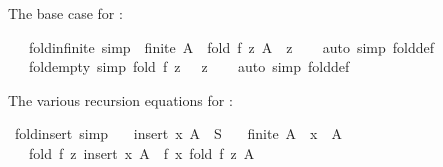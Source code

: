 \begin{isabellebody}
\begin{isamarkuptext}
The base case for :%
\end{isamarkuptext}\isamarkuptrue%
\isamarkupfalse%
\ {\isacharparenleft}{\kern0pt}\ {\isacharminus}{\kern0pt}{\isacharparenright}{\kern0pt}\ fold{\isacharunderscore}{\kern0pt}infinite\ {\isacharbrackleft}{\kern0pt}simp{\isacharbrackright}{\kern0pt}{\isacharcolon}{\kern0pt}\ {\isachardoublequoteopen}{\isasymnot}\ finite\ A\ {\isasymLongrightarrow}\ fold\ f\ z\ A\ {\isacharequal}{\kern0pt}\ z{\isachardoublequoteclose}\isanewline
%
\isadelimproof
\ \ %
\endisadelimproof
%
\isatagproof
{}\isamarkupfalse%
\ {\isacharparenleft}{\kern0pt}auto\ simp{\isacharcolon}{\kern0pt}\ fold{\isacharunderscore}{\kern0pt}def{\isacharparenright}{\kern0pt}%
\endisatagproof
{\isafoldproof}%
%
\isadelimproof
\isanewline
%
\endisadelimproof
\isanewline
{}\isamarkupfalse%
\ {\isacharparenleft}{\kern0pt}\ {\isacharminus}{\kern0pt}{\isacharparenright}{\kern0pt}\ fold{\isacharunderscore}{\kern0pt}empty\ {\isacharbrackleft}{\kern0pt}simp{\isacharbrackright}{\kern0pt}{\isacharcolon}{\kern0pt}\ {\isachardoublequoteopen}fold\ f\ z\ {\isacharbraceleft}{\kern0pt}{\isacharbraceright}{\kern0pt}\ {\isacharequal}{\kern0pt}\ z{\isachardoublequoteclose}\isanewline
%
\isadelimproof
\ \ %
\endisadelimproof
%
\isatagproof
{}\isamarkupfalse%
\ {\isacharparenleft}{\kern0pt}auto\ simp{\isacharcolon}{\kern0pt}\ fold{\isacharunderscore}{\kern0pt}def{\isacharparenright}{\kern0pt}%
\endisatagproof
{\isafoldproof}%
%
\isadelimproof
%
\endisadelimproof
%
\begin{isamarkuptext}%
The various recursion equations for :%
\end{isamarkuptext}\isamarkuptrue%
\isamarkupfalse%
\ fold{\isacharunderscore}{\kern0pt}insert\ {\isacharbrackleft}{\kern0pt}simp{\isacharbrackright}{\kern0pt}{\isacharcolon}{\kern0pt}\isanewline
\ \ \ {\isachardoublequoteopen}insert\ x\ A\ {\isasymsubseteq}\ S{\isachardoublequoteclose}\isanewline
\ \ \ {\isachardoublequoteopen}finite\ A{\isachardoublequoteclose}\ \ {\isachardoublequoteopen}x\ {\isasymnotin}\ A{\isachardoublequoteclose}\isanewline
\ \ \ {\isachardoublequoteopen}fold\ f\ z\ {\isacharparenleft}{\kern0pt}insert\ x\ A{\isacharparenright}{\kern0pt}\ {\isacharequal}{\kern0pt}\ f\ x\ {\isacharparenleft}{\kern0pt}fold\ f\ z\ A{\isacharparenright}{\kern0pt}{\isachardoublequoteclose}\isanewline
%
\isadelimproof
%
\endisadelimproof
%
\isatagproof
{}\isamarkupfalse%

\end{isabellebody}
